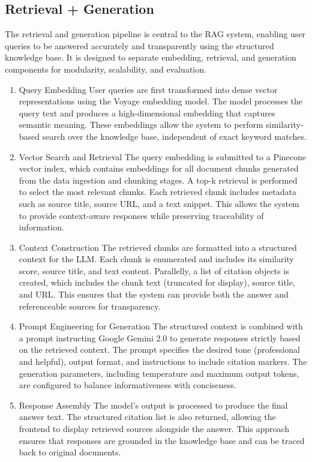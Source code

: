 \subsection{Retrieval + Generation}\label{SCM}
The retrieval and generation pipeline is central to the RAG system, enabling user queries to be answered accurately and transparently using the structured knowledge base. It is designed to separate embedding, retrieval, and generation components for modularity, scalability, and evaluation.
\begin{enumerate}
	\item Query Embedding
	User queries are first transformed into dense vector representations using the Voyage embedding model. The model processes the query text and produces a high-dimensional embedding that captures semantic meaning. These embeddings allow the system to perform similarity-based search over the knowledge base, independent of exact keyword matches.
	
	\item Vector Search and Retrieval
	The query embedding is submitted to a Pinecone vector index, which contains embeddings for all document chunks generated from the data ingestion and chunking stages. A top-k retrieval is performed to select the most relevant chunks. Each retrieved chunk includes metadata such as source title, source URL, and a text snippet. This allows the system to provide context-aware responses while preserving traceability of information.
	
	\item Context Construction
	The retrieved chunks are formatted into a structured context for the LLM. Each chunk is enumerated and includes its similarity score, source title, and text content. Parallelly, a list of citation objects is created, which includes the chunk text (truncated for display), source title, and URL. This ensures that the system can provide both the answer and referenceable sources for transparency.
	
	\item Prompt Engineering for Generation
	The structured context is combined with a prompt instructing Google Gemini 2.0 to generate responses strictly based on the retrieved context. The prompt specifies the desired tone (professional and helpful), output format, and instructions to include citation markers. The generation parameters, including temperature and maximum output tokens, are configured to balance informativeness with conciseness.
	
	\item Response Assembly
	The model’s output is processed to produce the final answer text. The structured citation list is also returned, allowing the frontend to display retrieved sources alongside the answer. This approach ensures that responses are grounded in the knowledge base and can be traced back to original documents.
	

\end{enumerate}
